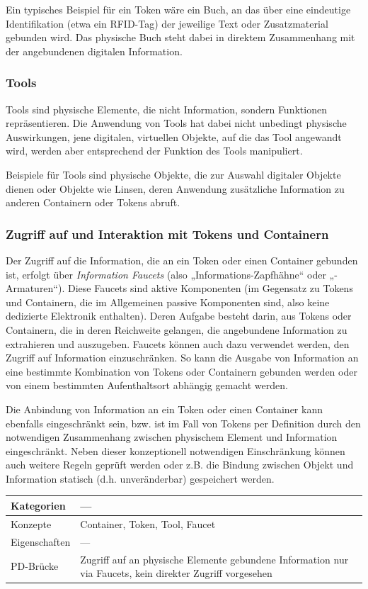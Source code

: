 Ein typisches Beispiel für ein Token wäre ein Buch, an das über eine eindeutige Identifikation (etwa ein \gls{RFID}-Tag) der jeweilige Text oder Zusatzmaterial gebunden wird. Das physische Buch steht dabei in direktem Zusammenhang mit der angebundenen digitalen Information.

\subsubsection{Tools}
Tools sind physische Elemente, die nicht Information, sondern Funktionen repräsentieren. Die Anwendung von Tools hat dabei nicht unbedingt physische Auswirkungen, jene digitalen, virtuellen Objekte, auf die das Tool angewandt wird, werden aber entsprechend der Funktion des Tools manipuliert.

Beispiele für Tools sind physische Objekte, die zur Auswahl digitaler Objekte dienen oder Objekte wie Linsen, deren Anwendung zusätzliche Information zu anderen Containern oder Tokens abruft.

\subsubsection{Zugriff auf und Interaktion mit Tokens und Containern}

Der Zugriff auf die Information, die an ein Token oder einen Container gebunden ist, erfolgt über \emph{Information Faucets} (also „Informations-Zapfhähne“ oder „-Armaturen“). Diese Faucets sind aktive Komponenten (im Gegensatz zu Tokens und Containern, die im Allgemeinen passive Komponenten sind, also keine dedizierte Elektronik enthalten). Deren Aufgabe besteht darin, aus Tokens oder Containern, die in deren Reichweite gelangen, die angebundene Information zu extrahieren und auszugeben. Faucets können auch dazu verwendet werden, den Zugriff auf Information einzuschränken. So kann die Ausgabe von Information an eine bestimmte Kombination von Tokens oder Containern gebunden werden oder von einem bestimmten Aufenthaltsort abhängig gemacht werden.

Die Anbindung von Information an ein Token oder einen Container kann ebenfalls eingeschränkt sein, bzw. ist im Fall von Tokens per Definition durch den notwendigen Zusammenhang zwischen physischem Element und Information eingeschränkt. Neben dieser konzeptionell notwendigen Einschränkung können auch weitere Regeln geprüft werden oder z.B. die Bindung zwischen Objekt und Information statisch (d.h. unveränderbar) gespeichert werden. 
\\[1em]
\begin{tabular}{| p{3cm} | p{10cm} |}
  \hline
  Kategorien & --- \\ \hline
  Konzepte & Container, Token, Tool, Faucet \\ \hline
  Eigenschaften & --- \\ \hline
  PD-Brücke & Zugriff auf an physische Elemente gebundene Information nur via Faucets, kein direkter Zugriff vorgesehen \\ \hline
\end{tabular} 

